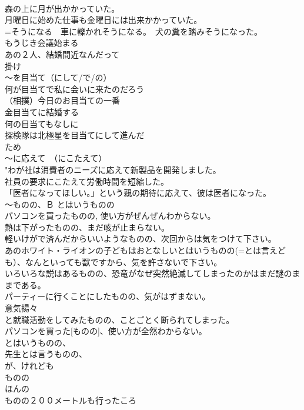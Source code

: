 \documentclass[8pt]{extreport}
\begin{document}
\begin{CJK}{UTF8}{min}
\\	森の上に月が出かかっていた。 
\\	月曜日に始めた仕事も金曜日には出来かかっていた。 
\\	=そうになる　車に轢かれそうになる。　犬の糞を踏みそうになった。 
\\	もうじき会議始まる 
\\	あの２人、結婚間近なんだって 
\\	掛け
\\	～を目当て（にして/で/の）	
\\	何が目当てで私に会いに来たのだろう 
\\	（相撲）今日のお目当ての一番 
\\	金目当てに結婚する 
\\	何の目当てもなしに 
\\	探検隊は北極星を目当てにして進んだ 
\\	ため
\\	～に応えて　（にこたえて）	
\\	"わが社は消費者のニーズに応えて新製品を開発しました。 
\\	社員の要求にこたえて労働時間を短縮した。 
\\	「医者になってほしい。」という親の期待に応えて、彼は医者になった。 
\\	～ものの、Ｂ とはいうものの	
\\	パソコンを買ったものの, 使い方がぜんぜんわからない。 
\\	熱は下がったものの、まだ咳が止まらない。 
\\	軽いけがで済んだからいいようなものの、次回からは気をつけて下さい。 
\\	あのホワイト・ライオンの子どもはおとなしいとはいうものの(=とは言えども）、なんといっても獣ですから、気を許さないで下さい。 
\\	いろいろな説はあるものの、恐竜がなぜ突然絶滅してしまったのかはまだ謎のままである。 
\\	パーティーに行くことにしたものの、気がはずまない。 
\\	意気揚々
\\	と就職活動をしてみたものの、ことごとく断られてしまった。 
\\	パソコンを買った[ものの]、使い方が全然わからない。 
\\	とはいうものの、
\\	先生とは言うものの、
\\	が、けれども 
\\	ものの 
\\	ほんの 
\\	ものの２００メートルも行ったころ 

\end{CJK}
\end{document}
